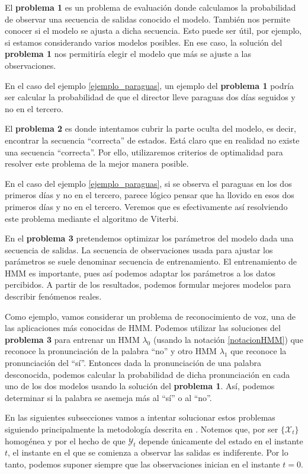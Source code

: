 El \textbf{problema 1} es un problema de evaluación donde calculamos la probabilidad de observar una secuencia de salidas conocido el modelo. También nos permite conocer si el modelo se ajusta a dicha secuencia. Esto puede ser útil, por ejemplo, si estamos considerando varios modelos posibles. En ese caso, la solución del \textbf{problema 1} nos permitiría elegir el modelo que más se ajuste a las observaciones.

En el caso del ejemplo \ref{ejemplo_paraguas}, un ejemplo del \textbf{problema 1} podría ser calcular la probabilidad de que el director lleve paraguas dos días seguidos y no en el tercero.

El \textbf{problema 2} es donde intentamos cubrir la parte oculta del modelo, es decir, encontrar la secuencia \enquote{correcta} de estados. Está claro que en realidad no existe una secuencia \enquote{correcta}. Por ello, utilizaremos criterios de optimalidad para resolver este problema de la mejor manera posible. 

En el caso del ejemplo \ref{ejemplo_paraguas}, si se observa el paraguas en los dos primeros días y no en el tercero, parece lógico pensar que ha llovido en esos dos primeros días y no en el tercero. Veremos que es efectivamente así resolviendo este problema mediante el algoritmo de Viterbi.

En el \textbf{problema 3} pretendemos optimizar los parámetros del modelo dada una secuencia de salidas. La secuencia de observaciones usada para ajustar los parámetros se suele denominar secuencia de entrenamiento. El entrenamiento de HMM es importante, pues así podemos adaptar los parámetros a los datos percibidos. A partir de los resultados, podemos formular mejores modelos para describir fenómenos reales.

Como ejemplo, vamos considerar un problema de reconocimiento de voz, una de las aplicaciones más conocidas de HMM. Podemos utilizar las soluciones del \textbf{problema 3} para entrenar un HMM $\lambda_0$ (usando la notación \eqref{notacionHMM}) que reconoce la pronunciación de la palabra \enquote{no} y otro HMM $\lambda_1$ que reconoce la pronunciación del \enquote{sí}. Entonces dada la pronunciación de una palabra desconocida, podemos calcular la probabilidad de dicha pronunciación en cada uno de los dos modelos usando la solución del \textbf{problema 1}. Así, podemos determinar si la palabra se asemeja más al \enquote{sí} o al \enquote{no}.  

En las siguientes subsecciones vamos a intentar solucionar estos problemas siguiendo principalmente la metodología descrita en \cite{Rabiner}. Notemos que, por ser $\{\mathcal{X}_t\}$ homogénea y por el hecho de que $\mathcal{Y}_t$ depende únicamente del estado en el instante $t$, el instante en el que se comienza a observar las salidas es indiferente. Por lo tanto, podemos suponer siempre que las observaciones inician en el instante $t=0$.

